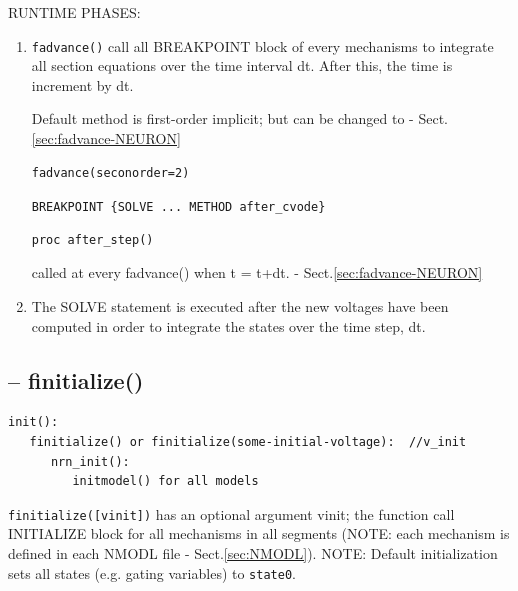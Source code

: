 RUNTIME PHASES:
\begin{enumerate}
  \item \verb!fadvance()! call all BREAKPOINT block of every mechanisms to
  integrate all section equations over the time interval dt. After this, the
  time is increment by dt.
  
Default method is first-order implicit; but can be changed to -
Sect.\ref{sec:fadvance-NEURON}
\begin{verbatim}
fadvance(seconorder=2)
\end{verbatim}
  
   \verb!BREAKPOINT {SOLVE ... METHOD after_cvode}!
  
\begin{verbatim}
proc after_step()
\end{verbatim}
called at every fadvance() when t = t+dt. - Sect.\ref{sec:fadvance-NEURON}
  
  \item  The SOLVE statement is executed after the new voltages have been
  computed in order to integrate the states over the time step, dt. 
\end{enumerate}

\subsection{-- finitialize()}
\label{sec:finitialize-NEURON}
\label{sec:initmodel()-NEURON}
\label{sec:nrn_init()-NEURON}


\begin{verbatim}
init():
   finitialize() or finitialize(some-initial-voltage):  //v_init
      nrn_init(): 
         initmodel() for all models
\end{verbatim}

\verb!finitialize([vinit])! has an optional argument vinit; the function call
INITIALIZE block for all mechanisms in all segments (NOTE:  each mechanism is
defined in each NMODL file - Sect.\ref{sec:NMODL}). NOTE: Default initialization
sets all states (e.g. gating variables) to \verb!state0!.

